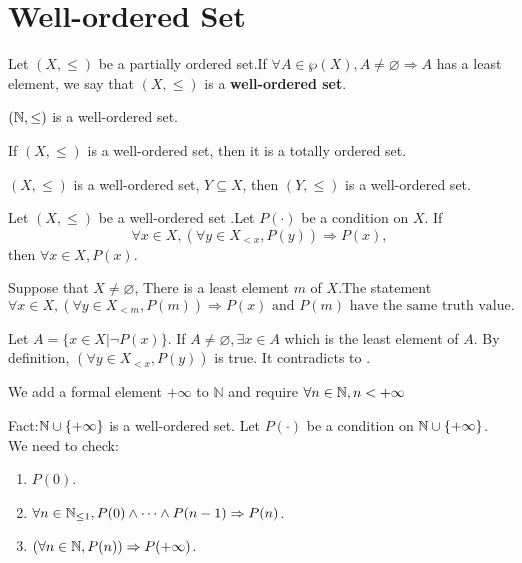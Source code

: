 \documentclass{book}
\numberwithin{equation}{section}
\begin{document}
\section{Well-ordered Set}
\begin{definitionenv}
    Let $(X, \le)$ be a partially ordered set.If $\forall A\in \wp(X), A\not=\varnothing\Rightarrow A$ has a least element, we say that $(X, \le)$ is a \textbf{well-ordered set}.
\end{definitionenv}
\begin{axiomenv}
    $(\mathbb{N}, \le)$ is a well-ordered set.
\end{axiomenv}
\begin{propositionenv}
    If $(X, \le)$ is a well-ordered set,  then it is a totally ordered set.
\end{propositionenv}
\begin{propositionenv}
    $(X, \le)$ is a well-ordered set, $Y\subseteq X$,  then $(Y, \le)$ is a well-ordered set. 
\end{propositionenv}
\begin{theoremenv}
    Let $(X, \le)$ be a well-ordered set .Let $P(\cdot)$ be a condition on $X$. If 
    $$\forall x\in X, (\forall y\in X_{<x} , P(y))\Rightarrow P(x), $$
    then $\forall x\in X, P(x)$.
\end{theoremenv}
\begin{remark}
    Suppose that $X\not=\varnothing$, There is a least element $m$ of $X$.The statement
    $$\forall x\in X, (\forall y\in X_{<m} , P(m))\Rightarrow P(x) \text{ and } P(m) \text{ have the same truth value.}$$
\end{remark}
\begin{proofenv}
    Let $A=\{x\in X|\neg P(x)\}$. If $A\not=\varnothing, \exists x\in A$ which is the least element of $A$. By definition,  $(\forall y\in X_{<x} , P(y))$ is true. It contradicts to .
\end{proofenv}
\begin{remark}
    We add a formal element $+\infty$ to $\mathbb{N}$ and require $\forall n\in \mathbb{N},  n<+\infty$
\end{remark}
Fact:$\mathbb{N} \cup \{+\infty\}$ is a well-ordered set. Let $P(\cdot)$ be a condition on $\mathbb{N} \cup \{+\infty\}$. We need to check:
\begin{enumerate}
    \item $P(0)$.
    \item $\forall n\in \mathbb{N}_{\leq 1}, P(0)\wedge\dots\wedge P(n-1)\Rightarrow P(n)$.
    \item $(\forall n \in \mathbb{N}, P(n))\Rightarrow P(+\infty)$.
\end{enumerate}
\end{document}
